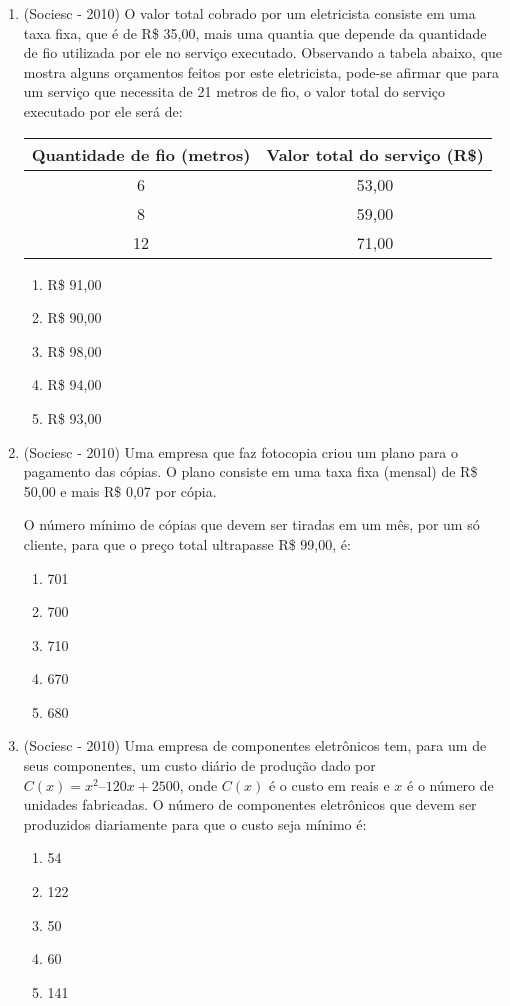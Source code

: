 \begin{enumerate}
 \item (Sociesc - 2010) O valor total cobrado por um eletricista consiste em uma taxa fixa, que é de R\$ 35,00, mais uma quantia que depende da quantidade de fio utilizada por ele no serviço executado. Observando a tabela abaixo, que mostra alguns orçamentos feitos por este eletricista, pode-se afirmar que para um serviço que necessita de 21 metros de fio, o valor total do serviço executado por ele será de:
  
  \begin{table}[H]
  \centering
 \begin{tabular}{|c|c|} \hline
  \multicolumn{1}{|c|}{\textbf{Quantidade de fio
(metros)}} & \multicolumn{1}{|c|}{\textbf{Valor total do serviço
(R\$)}} \\ \hline
 6 & 53,00 \\ \hline
 8 & 59,00 \\ \hline
 12 & 71,00 \\ \hline
 \end{tabular}
\end{table}  
  
  \begin{enumerate}
  \item R\$ 91,00
  \item R\$ 90,00
  \item R\$ 98,00
  \item R\$ 94,00
  \item R\$ 93,00
 \end{enumerate}
 
 \item (Sociesc - 2010) Uma empresa que faz fotocopia criou um plano para o pagamento das cópias. O plano consiste em uma taxa fixa (mensal) de R\$ 50,00 e mais R\$ 0,07 por cópia.
  
  O número mínimo de cópias que devem ser tiradas em um mês, por um só cliente, para que o preço total ultrapasse R\$ 99,00, é:
  \begin{enumerate}
  \item 701
  \item 700
  \item 710
  \item 670
  \item 680
 \end{enumerate}
 
 \item (Sociesc - 2010) Uma empresa de componentes eletrônicos tem, para um de seus componentes, um custo diário de produção dado por $C(x) = x^2 – 120x + 2500$, onde $C(x)$ é o custo em reais e $x$ é o número de unidades fabricadas. O número de componentes eletrônicos que devem ser produzidos diariamente para que o custo seja mínimo é:
 \begin{enumerate}
  \item 54
  \item 122
  \item 50
  \item 60
  \item 141
 \end{enumerate}
 

\end{enumerate}
